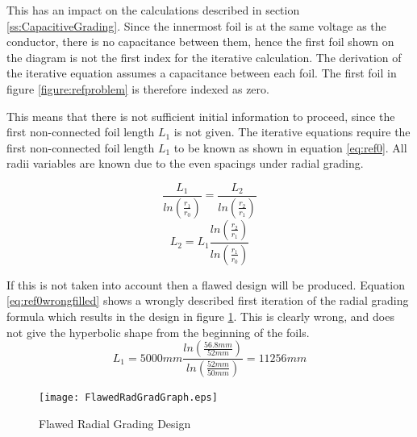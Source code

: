 This has an impact on the calculations described in section \ref{ss:CapacitiveGrading}.
Since the innermost foil is at the same voltage as the conductor, there is no capacitance between them, hence the first foil shown on the diagram is not the first index for the iterative calculation.
The derivation of the iterative equation assumes a capacitance between each foil. 
The first foil in figure \ref{figure:refproblem} is therefore indexed as zero.

This means that there is not sufficient initial information to proceed, since the first non-connected foil length $L_1$ is not given.
The iterative equations require the first non-connected foil length $L_1$ to be known as shown in equation \ref{eq:ref0}. 
All radii variables are known due to the even spacings under radial grading. 

\begin{equation}
   \label{eq:ref0}
   \frac{L_{1}}{ln(\frac{r_{1}}{r_{0}})} = \frac{ L_{2}}{ln(\frac{r_{2}}{r_{1}})} 
\end{equation}
\begin{equation}
   \label{eq:ref0forl1}
   L_{2} = L_{1}\frac{{ln(\frac{r_{2}}{r_{1}})} }{ln(\frac{r_{1}}{r_{0}})} 
\end{equation}


If this is not taken into account then a flawed design will be produced.
Equation \ref{eq:ref0wrongfilled} shows a wrongly described first iteration of the radial grading formula which results in the design in figure \ref{figure:flawedgraph}. This is clearly wrong, and does not give the hyperbolic shape from the beginning of the foils.
\begin{equation}
   \label{eq:ref0wrongfilled}
   L_{1} = 5000mm\frac{{ln(\frac{56.8mm}{52mm})} }{ln(\frac{52mm}{50mm})}
   = 11256mm
\end{equation}

\begin{figure}[!h]
   \centering
   \texttt{[image: FlawedRadGradGraph.eps]}
   \caption{Flawed Radial Grading Design}
   \label{figure:flawedgraph}
\end{figure}

